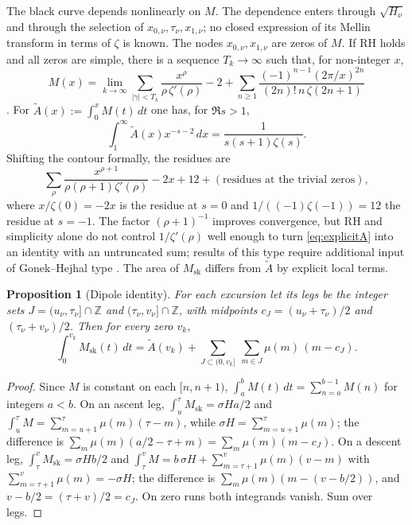 \documentclass[11pt]{amsart}
\numberwithin{equation}{section}
\theoremstyle{plain}
\newtheorem{proposition}[theorem]{Proposition}
\theoremstyle{definition}
\theoremstyle{remark}
\newcommand{\Msk}{M_{\mathrm{sk}}}
\begin{document}
The black curve depends nonlinearly on $M$. The dependence enters through
$\sqrt{H_\nu}$ and through the selection of
$x_{0,\nu},\tau_\nu,x_{1,\nu}$; no closed expression of its Mellin transform
in terms of $\zeta$ is known. The nodes
$x_{0,\nu},x_{1,\nu}$ are zeros of $M$. If RH holds and all zeros are
simple, there is a sequence $T_k\to\infty$ such that, for non-integer $x$,
\begin{equation}
\label{eq:explicitM}
  M(x)=\lim_{k\to\infty}\sum_{|\gamma|<T_k}\frac{x^\rho}{\rho\,\zeta'(\rho)}-2
  +\sum_{n\ge1}\frac{(-1)^{n-1}(2\pi/x)^{2n}}{(2n)!\,n\,\zeta(2n+1)}
\end{equation}
\cite[\S14.27]{Titchmarsh1986}. For $\widetilde{A}(x):=\int_0^xM(t)\,dt$ one
has, for $\Re s>1$,
\begin{equation}
\label{eq:mellin_A}
  \int_1^\infty \widetilde{A}(x)x^{-s-2}\,dx=\frac{1}{s(s+1)\zeta(s)}.
\end{equation}
Shifting the contour formally, the residues are
\begin{equation}
\label{eq:explicitA}
  \sum_\rho\frac{x^{\rho+1}}{\rho(\rho+1)\zeta'(\rho)}-2x+12
  +(\text{residues at the trivial zeros}),
\end{equation}
where $x/\zeta(0)=-2x$ is the residue at $s=0$ and
$1/((-1)\zeta(-1))=12$ the residue at $s=-1$. The factor $(\rho+1)^{-1}$
improves convergence, but RH and simplicity alone do not control
$1/\zeta'(\rho)$ well enough to turn \eqref{eq:explicitA} into an identity
with an untruncated sum; results of this type require additional input of
Gonek--Hejhal type \cite{Ng2004}. The area of $\Msk$ differs from
$\widetilde A$ by explicit local terms.

\begin{proposition}[Dipole identity]
\label{prop:dipoles}
For each excursion let its \emph{legs} be the integer sets
$J=(u_\nu,\tau_\nu]\cap\mathbb{Z}$ and
$(\tau_\nu,v_\nu]\cap\mathbb{Z}$, with midpoints $c_J=(u_\nu+\tau_\nu)/2$
and $(\tau_\nu+v_\nu)/2$. Then for every zero $v_k$,
\begin{equation}
\label{eq:dipoles}
  \int_0^{v_k}\Msk(t)\,dt=\widetilde{A}(v_k)
  +\sum_{J\subset(0,v_k]}\ \sum_{m\in J}\mu(m)\,(m-c_J).
\end{equation}
\end{proposition}

\begin{proof}
Since $M$ is constant on each $[n,n+1)$, $\int_a^bM(t)\,dt=\sum_{n=a}^{b-1}M(n)$
for integers $a<b$. On an ascent leg, $\int_{u}^{\tau}\Msk=\sigma H a/2$ and
$\int_u^\tau M=\sum_{m=u+1}^{\tau}\mu(m)(\tau-m)$, while
$\sigma H=\sum_{m=u+1}^{\tau}\mu(m)$; the difference is
$\sum_m\mu(m)(a/2-\tau+m)=\sum_m\mu(m)(m-c_J)$. On a descent leg,
$\int_\tau^v\Msk=\sigma Hb/2$ and
$\int_\tau^vM=b\,\sigma H+\sum_{m=\tau+1}^{v}\mu(m)(v-m)$ with
$\sum_{m=\tau+1}^{v}\mu(m)=-\sigma H$; the difference is
$\sum_m\mu(m)(m-(v-b/2))$, and $v-b/2=(\tau+v)/2=c_J$. On zero runs
both integrands vanish. Sum over legs.
\end{proof}
\end{document}
